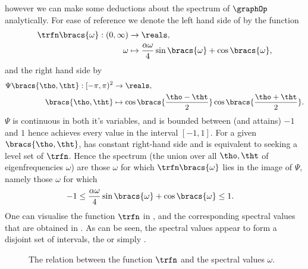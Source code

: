 however we can make some deductions about the spectrum of $\graphOp$ analytically.
For ease of reference we denote the left hand side of  by the function
\begin{align*}
	\trfn\bracs{\omega}:(0,\infty)&\rightarrow\reals, \\
	\omega &\mapsto \frac{\alpha\omega}{4}\sin\bracs{\omega} + \cos\bracs{\omega},
\end{align*}
and the right hand side by
\begin{align*}
	\Psi\bracs{\tho,\tht}:[-\pi,\pi)^{2}&\rightarrow\reals, \\
	\bracs{\tho,\tht}&\mapsto \cos\bracs{\frac{\tho-\tht}{2}}\cos\bracs{\frac{\tho+\tht}{2}}.
\end{align*}
$\Psi$ is continuous in both it's variables, and is bounded between (and attains) $-1$ and $1$ hence achieves every value in the interval $[-1, 1]$.
For a given $\bracs{\tho,\tht}$,  has constant right-hand side and is equivalent to seeking a level set of $\trfn$.
Hence the spectrum (the union over all $\tho,\tht$ of eigenfrequencies $\omega$) are those $\omega$ for which $\trfn\bracs{\omega}$ lies in the image of $\Psi$, namely those $\omega$ for which
\begin{align} \label{eq:OmegaCriterion}
	-1 \leq \frac{\alpha\omega}{4}\sin\bracs{\omega} + \cos\bracs{\omega} &\leq 1.
\end{align}
One can visualise the function $\trfn$ in , and the corresponding spectral values that are obtained in .
As can be seen, the spectral values appear to form a disjoint set of intervals, the  or simply .
\begin{figure}[t!]
    \centering
	\quad
	\caption{The relation between the function $\trfn$ and the spectral values $\omega$. \label{fig:NonClassicalKirchhoffStuff}}
\end{figure} \newline

